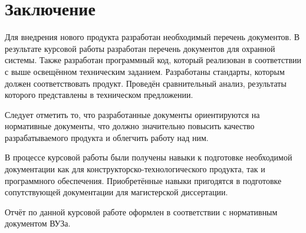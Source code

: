 \chapter*{Заключение}
Для внедрения нового продукта разработан необходимый перечень документов.
В результате курсовой работы разработан перечень документов для охранной системы.
Также разработан программный код, который реализован в соответствии с выше освещённом 
техническим заданием. Разработаны стандарты, которым должен соответствовать продукт.
Проведён сравнительный анализ, результаты которого представлены в техническом
предложении.

Следует отметить то, что разработанные документы ориентируются на нормативные документы,
что должно значительно повысить качество разрабатываемого продукта и облегчить работу над ним.

В процессе курсовой работы были получены навыки к подготовке необходимой документации как для
конструкторско-технологического продукта, так и программного обеспечения. Приобретённые навыки пригодятся
в подготовке сопутствующей документации для магистерской диссертации.

Отчёт по данной курсовой работе оформлен в соответствии с нормативным документом ВУЗа\cite{norm}.
